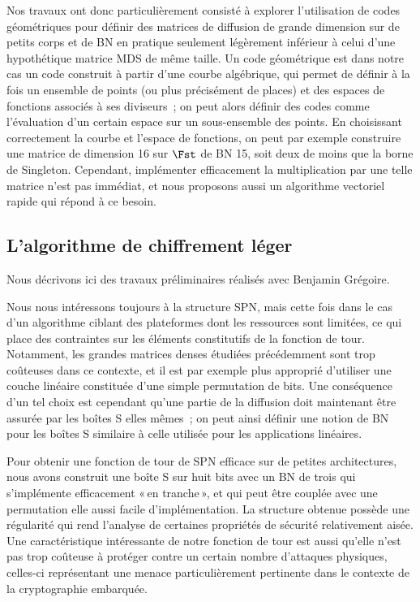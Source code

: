 Nos travaux ont donc particulièrement consisté à explorer l'utilisation de codes géométriques pour définir des matrices de diffusion
de grande dimension sur de petits corps et de BN en pratique seulement légèrement inférieur à celui d'une hypothétique matrice MDS de même taille.
Un code géométrique est dans notre cas un code construit à partir d'une courbe algébrique, qui permet de définir à la fois un ensemble
de points (ou plus précisément de places) et des espaces de fonctions associés à ses diviseurs~; on peut alors définir des codes
comme l'évaluation d'un certain espace sur un sous-ensemble des points.
En choisissant correctement la courbe et l'espace de fonctions, on peut par exemple construire une matrice de dimension 16 sur
$\Fst$ de BN 15, soit deux de moins que la borne de Singleton. Cependant, implémenter efficacement la multiplication par une telle
matrice n'est pas immédiat, et nous proposons aussi un algorithme vectoriel rapide qui répond à ce besoin.

\subsection{L'algorithme de chiffrement léger \fly \cite{fly}}

Nous décrivons ici des travaux préliminaires réalisés avec Benjamin Grégoire.

\medskip

Nous nous intéressons toujours à la structure SPN, mais cette fois dans le cas d'un algorithme ciblant des plateformes dont les ressources
sont limitées, ce qui place des contraintes sur les éléments constitutifs de la fonction de tour. Notamment, les grandes matrices
denses étudiées précédemment sont trop coûteuses dans ce contexte, et il est par exemple plus approprié d'utiliser une couche linéaire
constituée d'une simple permutation de bits. Une conséquence d'un tel choix est cependant qu'une partie de la diffusion doit maintenant
être assurée par les boîtes S elles mêmes~; on peut ainsi définir une notion de BN pour les boîtes S similaire à celle utilisée pour
les applications linéaires.

Pour obtenir une fonction de tour de SPN efficace sur de petites architectures, nous avons construit une boîte S sur huit bits avec
un BN de trois qui s'implémente efficacement «\,en tranche\,», et qui peut être couplée avec une permutation elle aussi facile
d'implémentation. La structure obtenue possède une régularité qui rend l'analyse de certaines propriétés de sécurité
relativement aisée. Une caractéristique intéressante de notre fonction de tour est aussi qu'elle n'est pas trop coûteuse à protéger
contre un certain nombre d'attaques physiques, celles-ci représentant une menace particulièrement pertinente dans le contexte
de la cryptographie embarquée.

